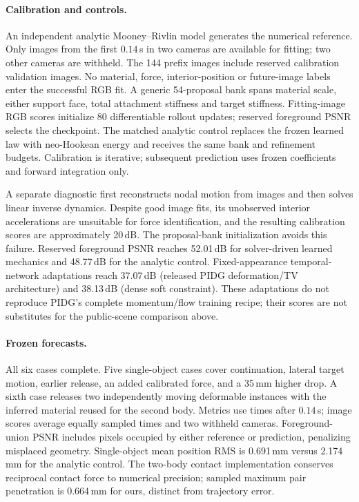 \paragraph{Calibration and controls.}
An independent analytic Mooney--Rivlin model generates the numerical reference. Only images from the first $0.14$\,s in two cameras are available for fitting; two other cameras are withheld. The 144 prefix images include reserved calibration validation images. No material, force, interior-position or future-image labels enter the successful RGB fit. A generic 54-proposal bank spans material scale, either support face, total attachment stiffness and target stiffness. Fitting-image RGB scores initialize 80 differentiable rollout updates; reserved foreground PSNR selects the checkpoint. The matched analytic control replaces the frozen learned law with neo-Hookean energy and receives the same bank and refinement budgets. Calibration is iterative; subsequent prediction uses frozen coefficients and forward integration only.

A separate diagnostic first reconstructs nodal motion from images and then solves linear inverse dynamics. Despite good image fits, its unobserved interior accelerations are unsuitable for force identification, and the resulting calibration scores are approximately 20\,dB. The proposal-bank initialization avoids this failure. Reserved foreground PSNR reaches 52.01\,dB for solver-driven learned mechanics and 48.77\,dB for the analytic control. Fixed-appearance temporal-network adaptations reach 37.07\,dB (released PIDG deformation/TV architecture) and 38.13\,dB (dense soft constraint). These adaptations do not reproduce PIDG's complete momentum/flow training recipe; their scores are not substitutes for the public-scene comparison above.

\clearpage
\paragraph{Frozen forecasts.}
All six cases complete. Five single-object cases cover continuation, lateral target motion, earlier release, an added calibrated force, and a 35\,mm higher drop. A sixth case releases two independently moving deformable instances with the inferred material reused for the second body. Metrics use times after $0.14$\,s; image scores average equally sampled times and two withheld cameras. Foreground-union PSNR includes pixels occupied by either reference or prediction, penalizing misplaced geometry. Single-object mean position RMS is 0.691\,mm versus 2.174\,mm for the analytic control. The two-body contact implementation conserves reciprocal contact force to numerical precision; sampled maximum pair penetration is 0.664\,mm for ours, distinct from trajectory error.

